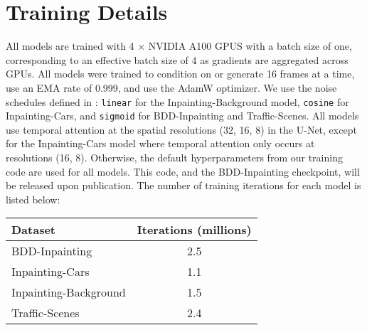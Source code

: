 \chapter{Training Details}

All models are trained with 4 $\times$ NVIDIA A100 GPUS with a batch size of one, corresponding to an effective batch size of 4 as gradients are aggregated across GPUs. 
All models were trained to condition on or generate 16 frames at a time, use an EMA rate of 0.999, and use the AdamW \citep{AdamW} optimizer. We use the noise schedules defined in \citet{noiseschedules}: \texttt{linear} for the Inpainting-Background model, \texttt{cosine} for Inpainting-Cars, and \texttt{sigmoid} for BDD-Inpainting and Traffic-Scenes. All models use temporal attention at the spatial resolutions (32, 16, 8) in the U-Net, except for the Inpainting-Cars model where temporal attention only occurs at resolutions (16, 8). Otherwise, the default hyperparameters from our training code are used for all models. This code, and the BDD-Inpainting checkpoint, will be released upon publication. The number of training iterations for each model is listed below:
\begin{table}[h!]
\centering
\begin{tabular}{lc}
\toprule
Dataset               & Iterations (millions) \\ 
\midrule
BDD-Inpainting        & 2.5                   \\
Inpainting-Cars       & 1.1                   \\
Inpainting-Background & 1.5                   \\
Traffic-Scenes        & 2.4                  \\
\bottomrule
\end{tabular}
\end{table}



